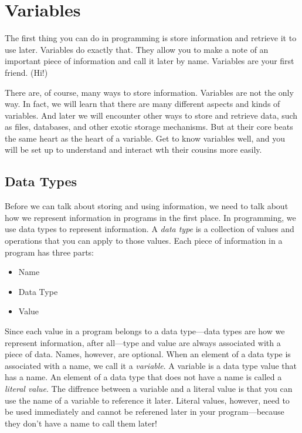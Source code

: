 \chapter[First Friend: Variables]{Variables}
The first thing you can do in programming is store information and retrieve it to use later. Variables do exactly that. They allow you to make a note of an important piece of information and call it later by name. Variables are your first friend. (Hi!)

There are, of course, many ways to store information. Variables are not the only way. In fact, we will learn that there are many different aspects and kinds of variables. And later we will encounter other ways to store and retrieve data, such as files, databases, and other exotic storage mechanisms. But at their core beats the same heart as the heart of a variable. Get to know variables well, and you will be set up to understand and interact wth their cousins more easily.

\section{Data Types}
Before we can talk about storing and using information, we need to talk about how we represent information in programs in the first place. In programming, we use data types to represent information. A \emph{data type} is a collection of values and operations that you can apply to those values. Each piece of information in a program has three parts:

\begin{itemize}
  \item Name
  \item Data Type
  \item Value
\end{itemize}

Since each value in a program belongs to a data type---data types are how we represent information, after all---type and value are always associated with a piece of data. Names, however, are optional. When an element of a data type is associated with a name, we call it a \emph{variable}. A variable is a data type value that has a name. An element of a data type that does not have a name is called a \emph{literal value}. The diffrence between a variable and a literal value is that you can use the name of a variable to reference it later. Literal values, however, need to be used immediately and cannot be referened later in your program---because they don't have a name to call them later!


